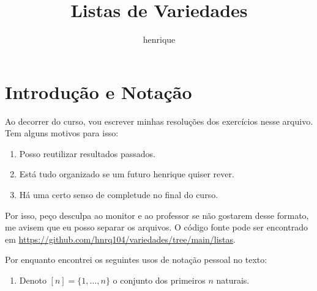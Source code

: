 \documentclass{article}
\author{henrique}
\title{Listas de Variedades}
\theoremstyle{definition}
\begin{document}
\maketitle

\tableofcontents
\setcounter{section}{-1}

\section{Introdução e Notação}
Ao decorrer do curso, vou escrever minhas resoluções dos exercícios nesse arquivo. Tem alguns motivos para isso:
\begin{enumerate}
	\item Posso reutilizar resultados passados.
	\item Está tudo organizado se um futuro henrique quiser rever.
	\item Há uma certo senso de completude no final do curso.
\end{enumerate}
Por isso, peço desculpa ao monitor e ao professor se não gostarem desse formato, me avisem que eu posso separar os arquivos.
O código fonte pode ser encontrado em \url{https://github.com/hnrq104/variedades/tree/main/listas}.

Por enquanto encontrei os seguintes usos de notação pessoal no texto:
\begin{enumerate}
	\item Denoto $[n] = \{1, \dots, n \}$ o conjunto dos primeiros $n$ naturais.
\end{enumerate}




\end{document}
